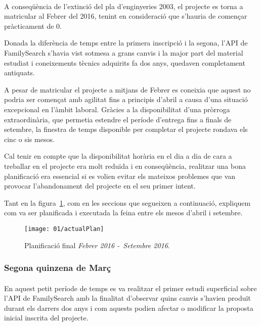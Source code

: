         \paragraph{}
        A  conseqüència de l’extinció del pla d’enginyeries 2003, el projecte es torna a matricular al Febrer del 2016, tenint en consideració que s'hauria de començar pràcticament de 0.

        Donada la diferència de temps entre la primera inscripció i la segona, l’\gls{API} de FamilySearch s'havia vist sotmesa a grans canvis i la major part del material estudiat i coneixements tècnics adquirits fa dos anys, quedaven completament antiquats.

        A pesar de matricular el projecte a mitjans de Febrer es coneixia que aquest no podria ser començat amb agilitat fins a principis d’abril a causa d'una situació excepcional en l'àmbit laboral. Gràcies a la disponibilitat d’una pròrroga extraordinària, que permetia estendre el període d'entrega fins a finals de setembre, la finestra de temps disponible per completar el projecte rondava els cinc o sis mesos.

        Cal tenir en compte que la disponibilitat horària en el dia a dia de cara a treballar en el projecte era molt reduïda i en conseqüència, realitzar una bona planificació era essencial si es volien evitar els mateixos problemes que van provocar l’abandonament del projecte en el seu primer intent.

        Tant en la figura~\ref{fig:actualPlan}, com en les seccions que segueixen a continuació, expliquem com va ser planificada i executada la feina entre els mesos d'abril i setembre.

        \begin{figure}
            \texttt{[image: 01/actualPlan]}
            \centering
            \caption{Planificació final \emph{Febrer 2016 -\ Setembre 2016}.\label{fig:actualPlan}}
        \end{figure}

        \subsubsection{Segona quinzena de Març}

            \paragraph{}
            En aquest petit període de temps es va realitzar el primer estudi superficial sobre l'\gls{API} de FamilySearch amb la finalitat d’observar quins canvis s'havien produït durant els darrers dos anys i com aquests podien afectar o modificar la proposta inicial inscrita del projecte.

